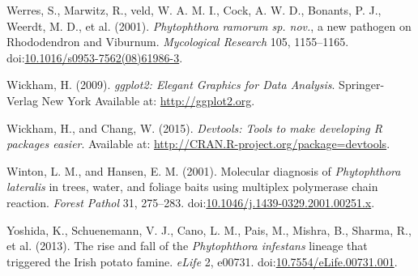 \documentclass[double,12pt]{beavtex}
\begin{document}
  \hypertarget{ref-werres2001phytophthora}{}
  Werres, S., Marwitz, R., veld, W. A. M. I., Cock, A. W. D., Bonants, P.
  J., Weerdt, M. D., et al. (2001). \emph{Phytophthora ramorum sp. nov.},
  a new pathogen on Rhododendron and Viburnum. \emph{Mycological Research}
  105, 1155--1165.
  doi:\href{https://doi.org/10.1016/s0953-7562(08)61986-3}{10.1016/s0953-7562(08)61986-3}.
  
  \hypertarget{ref-wickham2009ggplot2}{}
  Wickham, H. (2009). \emph{ggplot2: Elegant Graphics for Data Analysis}.
  Springer-Verlag New York Available at: \url{http://ggplot2.org}.
  
  \hypertarget{ref-wickham2015devtools}{}
  Wickham, H., and Chang, W. (2015). \emph{Devtools: Tools to make
  developing R packages easier}. Available at:
  \url{http://CRAN.R-project.org/package=devtools}.
  
  \hypertarget{ref-winton2001molecular}{}
  Winton, L. M., and Hansen, E. M. (2001). Molecular diagnosis of
  \emph{Phytophthora lateralis} in trees, water, and foliage baits using
  multiplex polymerase chain reaction. \emph{Forest Pathol} 31, 275--283.
  doi:\href{https://doi.org/10.1046/j.1439-0329.2001.00251.x}{10.1046/j.1439-0329.2001.00251.x}.
  
  \hypertarget{ref-yoshida2013rise}{}
  Yoshida, K., Schuenemann, V. J., Cano, L. M., Pais, M., Mishra, B.,
  Sharma, R., et al. (2013). The rise and fall of the \emph{Phytophthora
  infestans} lineage that triggered the Irish potato famine. \emph{eLife}
  2, e00731.
  doi:\href{https://doi.org/10.7554/eLife.00731.001}{10.7554/eLife.00731.001}.
\end{document}
